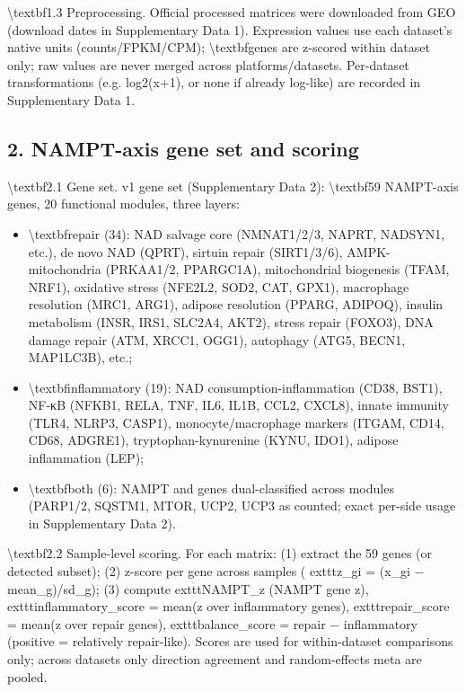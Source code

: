 \documentclass[11pt]{article}
\begin{document}
\textbackslash{}textbf{1.3 Preprocessing.} Official processed matrices were downloaded from GEO (download dates in Supplementary Data 1). Expression values use each dataset's native units (counts/FPKM/CPM); \textbackslash{}textbf{genes are z-scored within dataset only; raw values are never merged across platforms/datasets}. Per-dataset transformations (e.g. log2(x+1), or none if already log-like) are recorded in Supplementary Data 1.

\subsection*{2. NAMPT-axis gene set and scoring}
\textbackslash{}textbf{2.1 Gene set.} v1 gene set (Supplementary Data 2): \textbackslash{}textbf{59 NAMPT-axis genes}, 20 functional modules, three layers:

\begin{itemize}\setlength{\itemsep}{1pt}
\item \textbackslash{}textbf{repair (34)}: NAD salvage core (NMNAT1/2/3, NAPRT, NADSYN1, etc.), de novo NAD (QPRT), sirtuin repair (SIRT1/3/6), AMPK-mitochondria (PRKAA1/2, PPARGC1A), mitochondrial biogenesis (TFAM, NRF1), oxidative stress (NFE2L2, SOD2, CAT, GPX1), macrophage resolution (MRC1, ARG1), adipose resolution (PPARG, ADIPOQ), insulin metabolism (INSR, IRS1, SLC2A4, AKT2), stress repair (FOXO3), DNA damage repair (ATM, XRCC1, OGG1), autophagy (ATG5, BECN1, MAP1LC3B), etc.;
\item \textbackslash{}textbf{inflammatory (19)}: NAD consumption-inflammation (CD38, BST1), NF-κB (NFKB1, RELA, TNF, IL6, IL1B, CCL2, CXCL8), innate immunity (TLR4, NLRP3, CASP1), monocyte/macrophage markers (ITGAM, CD14, CD68, ADGRE1), tryptophan-kynurenine (KYNU, IDO1), adipose inflammation (LEP);
\item \textbackslash{}textbf{both (6)}: NAMPT and genes dual-classified across modules (PARP1/2, SQSTM1, MTOR, UCP2, UCP3 as counted; exact per-side usage in Supplementary Data 2).
\end{itemize}
\textbackslash{}textbf{2.2 Sample-level scoring.} For each matrix: (1) extract the 59 genes (or detected subset); (2) z-score per gene across samples (	exttt{z\_gi = (x\_gi − mean\_g)/sd\_g}); (3) compute 	exttt{NAMPT\_z} (NAMPT gene z), 	exttt{inflammatory\_score = mean(z over inflammatory genes)}, 	exttt{repair\_score = mean(z over repair genes)}, 	exttt{balance\_score = repair − inflammatory} (positive = relatively repair-like). Scores are used for within-dataset comparisons only; across datasets only direction agreement and random-effects meta are pooled.
\end{document}

